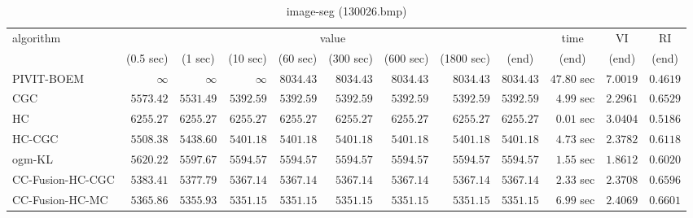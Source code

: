 \begin{table}[H]
\scriptsize
\centering
\caption{image-seg (130026.bmp)}
\label{tab:anytimetable-image-seg-130026.bmp}
\begin{tabular}{lrrrrrrrrrrr}
\toprule
           algorithm &                                   \multicolumn{8}{c}{value} & \multicolumn{1}{c}{time}    & \multicolumn{1}{c}{VI}  & \multicolumn{1}{c}{RI} \\  
\cmidrule(lr){2-9}\cmidrule(lr){10-10} \cmidrule(lr){11-11} \cmidrule(lr){12-12}   
                     & \multicolumn{1}{c}{(0.5 sec)} & \multicolumn{1}{c}{(1 sec)} & \multicolumn{1}{c}{(10 sec)} & \multicolumn{1}{c}{(60 sec)} & \multicolumn{1}{c}{(300 sec)} & \multicolumn{1}{c}{(600 sec)} & \multicolumn{1}{c}{(1800 sec)} & \multicolumn{1}{c}{(end)} & \multicolumn{1}{c}{(end)}    & \multicolumn{1}{c}{(end)}   & \multicolumn{1}{c}{(end)}  \\ \midrule 
          PIVIT-BOEM & $\infty$ & $\infty$ & $\infty$ & $      8034.43$ & $      8034.43$ & $      8034.43$ & $      8034.43$ & $      8034.43$ & $        47.80$ sec    & $       7.0019$  & $       0.4619$ \\ 
                 CGC & $      5573.42$ & $      5531.49$ & $      5392.59$ & $      5392.59$ & $      5392.59$ & $      5392.59$ & $      5392.59$ & $      5392.59$ & $         4.99$ sec    & $       2.2961$  & $       0.6529$ \\ 
                  HC & $      6255.27$ & $      6255.27$ & $      6255.27$ & $      6255.27$ & $      6255.27$ & $      6255.27$ & $      6255.27$ & $      6255.27$ & $         0.01$ sec    & $       3.0404$  & $       0.5186$ \\ 
              HC-CGC & $      5508.38$ & $      5438.60$ & $      5401.18$ & $      5401.18$ & $      5401.18$ & $      5401.18$ & $      5401.18$ & $      5401.18$ & $         4.73$ sec    & $       2.3782$  & $       0.6118$ \\ 
              ogm-KL & $      5620.22$ & $      5597.67$ & $      5594.57$ & $      5594.57$ & $      5594.57$ & $      5594.57$ & $      5594.57$ & $      5594.57$ & $         1.55$ sec    & $       1.8612$  & $       0.6020$ \\ 
    CC-Fusion-HC-CGC & $      5383.41$ & $      5377.79$ & $      5367.14$ & $      5367.14$ & $      5367.14$ & $      5367.14$ & $      5367.14$ & $      5367.14$ & $         2.33$ sec    & $       2.3708$  & $       0.6596$ \\ 
     CC-Fusion-HC-MC & $      5365.86$ & $      5355.93$ & $      5351.15$ & $      5351.15$ & $      5351.15$ & $      5351.15$ & $      5351.15$ & $      5351.15$ & $         6.99$ sec    & $       2.4069$  & $       0.6601$ \\ 

\end{tabular}
\end{table}
